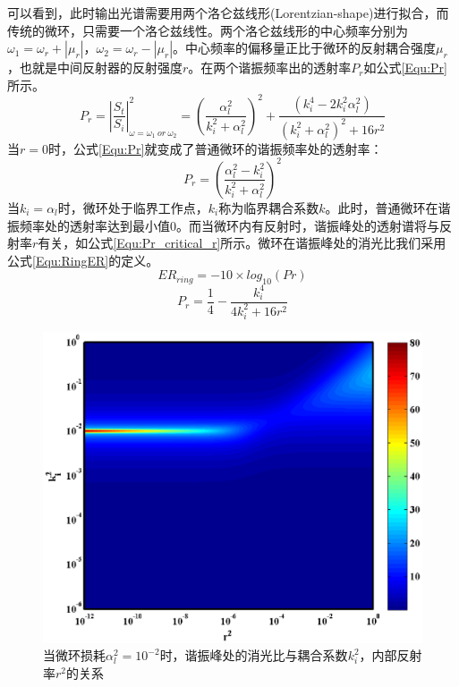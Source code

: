 可以看到，此时输出光谱需要用两个洛仑兹线形(Lorentzian-shape)进行拟合，而传统的微环，只需要一个洛仑兹线性。两个洛仑兹线形的中心频率分别为$\omega_1 = \omega_r+|\mu_r|$，$\omega_2=\omega_r-|\mu_r|$。中心频率的偏移量正比于微环的反射耦合强度$\mu_r$，也就是中间反射器的反射强度$r$。在两个谐振频率出的透射率$P_r$如公式\ref{Equ:Pr}所示。
\begin{equation}
\label{Equ:Pr}
P_r = \left|\frac{S_t}{S_i}\right|^2_{\omega = \omega_1~or~\omega_2}= \left(\frac{\alpha_l^2}{k_i^2+\alpha_l^2}\right)^2+\frac{(k_i^4-2k_i^2\alpha_l^2)}{(k_i^2+\alpha_l^2)^2+16r^2}
\end{equation}
当$r=0$时，公式\ref{Equ:Pr}就变成了普通微环的谐振频率处的透射率：
\begin{equation}
\label{Equ:Pr_no_r}
P_r=\left(\frac{\alpha_l^2-k_i^2}{k_i^2+\alpha_l^2}\right)^2
\end{equation}
当$k_i = \alpha_l$时，微环处于临界工作点，$k_i$称为临界耦合系数$k$。此时，普通微环在谐振频率处的透射率达到最小值0。而当微环内有反射时，谐振峰处的透射谱将与反射率$r$有关，如公式\ref{Equ:Pr_critical_r}所示。微环在谐振峰处的消光比我们采用公式\ref{Equ:RingER}的定义。
\begin{equation}
\label{Equ:RingER}
ER_{ring}=-10 \times log_{10}(Pr)
\end{equation}
\begin{equation}
\label{Equ:Pr_critical_r}
P_r=\frac{1}{4}-\frac{k_i^4}{4k_i^2+16r^2}
\end{equation}
\begin{figure}[htb]
	\centering
	\includegraphics[width=12cm]{./Pictures/chapt5_r_k_Ex_alpha1e-2.eps}
	\caption{当微环损耗$\alpha_l^2= 10^{-2}$时，谐振峰处的消光比与耦合系数$k_i^2$，内部反射率$r^2$的关系}
	\label{chapt5_r_k_Ex_alpha1e-2}
\end{figure}
